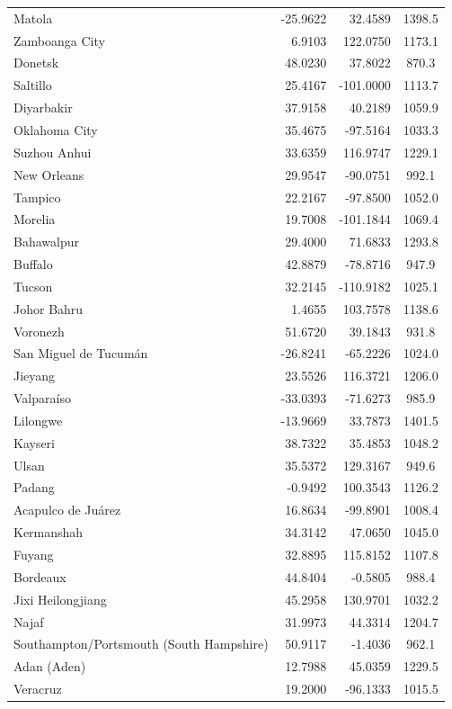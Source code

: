 \begin{longtable}{lrrc}
Matola & -25.9622 & 32.4589 & 1398.5 \\
Zamboanga City & 6.9103 & 122.0750 & 1173.1 \\
Donetsk & 48.0230 & 37.8022 & 870.3 \\
Saltillo & 25.4167 & -101.0000 & 1113.7 \\
Diyarbakir & 37.9158 & 40.2189 & 1059.9 \\
Oklahoma City & 35.4675 & -97.5164 & 1033.3 \\
Suzhou  Anhui & 33.6359 & 116.9747 & 1229.1 \\
New Orleans & 29.9547 & -90.0751 & 992.1 \\
Tampico & 22.2167 & -97.8500 & 1052.0 \\
Morelia & 19.7008 & -101.1844 & 1069.4 \\
Bahawalpur & 29.4000 & 71.6833 & 1293.8 \\
Buffalo & 42.8879 & -78.8716 & 947.9 \\
Tucson & 32.2145 & -110.9182 & 1025.1 \\
Johor Bahru & 1.4655 & 103.7578 & 1138.6 \\
Voronezh & 51.6720 & 39.1843 & 931.8 \\
San Miguel de Tucumán & -26.8241 & -65.2226 & 1024.0 \\
Jieyang & 23.5526 & 116.3721 & 1206.0 \\
Valparaíso & -33.0393 & -71.6273 & 985.9 \\
Lilongwe & -13.9669 & 33.7873 & 1401.5 \\
Kayseri & 38.7322 & 35.4853 & 1048.2 \\
Ulsan & 35.5372 & 129.3167 & 949.6 \\
Padang & -0.9492 & 100.3543 & 1126.2 \\
Acapulco de Juárez & 16.8634 & -99.8901 & 1008.4 \\
Kermanshah & 34.3142 & 47.0650 & 1045.0 \\
Fuyang & 32.8895 & 115.8152 & 1107.8 \\
Bordeaux & 44.8404 & -0.5805 & 988.4 \\
Jixi  Heilongjiang & 45.2958 & 130.9701 & 1032.2 \\
Najaf & 31.9973 & 44.3314 & 1204.7 \\
Southampton/Portsmouth (South Hampshire) & 50.9117 & -1.4036 & 962.1 \\
Adan (Aden) & 12.7988 & 45.0359 & 1229.5 \\
Veracruz & 19.2000 & -96.1333 & 1015.5 \\

\end{longtable}
